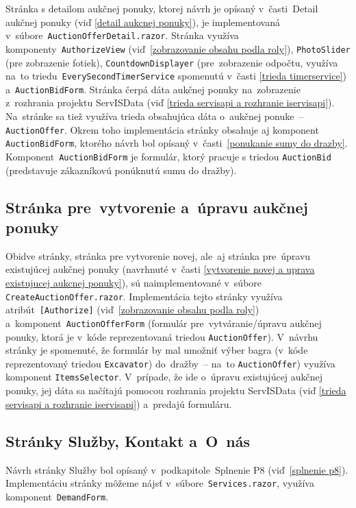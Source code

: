 Stránka s detailom aukčnej ponuky, ktorej návrh je opísaný v~časti~Detail aukčnej ponuky (viď \ref{detail aukcnej ponuky}), je implementovaná v~súbore~\verb|AuctionOfferDetail.razor|. Stránka využíva komponenty~\verb|AuthorizeView| (viď~\ref{zobrazovanie obsahu podla roly}), \verb|PhotoSlider| (pre zobrazenie fotiek), \verb|CountdownDisplayer| (pre~zobrazenie odpočtu, využíva na~to triedu~\verb|EverySecondTimerService| spomenutú v~časti \ref{trieda timerservice}) a~\verb|AuctionBidForm|. Stránka čerpá dáta aukčnej ponuky na~zobrazenie z~rozhrania projektu ServISData (viď \ref{trieda servisapi a rozhranie iservisapi}). Na~stránke sa tiež využíva trieda obsahujúca dáta o~aukčnej ponuke~-- \verb|AuctionOffer|. Okrem toho implementácia stránky obsahuje aj komponent \verb|AuctionBidForm|, ktorého návrh bol opísaný v~časti~\ref{ponukanie sumy do drazby}. Komponent~\verb|AuctionBidForm| je formulár, ktorý pracuje s triedou \verb|AuctionBid| (predstavuje zákazníkovú ponúknutú sumu do dražby).

\subsection{Stránka pre~vytvorenie a~úpravu aukčnej ponuky}

Obidve stránky, stránka pre vytvorenie novej, ale~aj stránka pre~úpravu existujúcej aukčnej ponuky (navrhnuté v~časti \ref{vytvorenie novej a uprava existujucej aukcnej ponuky}), sú naimplementované v~súbore \verb|CreateAuctionOffer.razor|. Implementácia tejto stránky využíva atribút~\verb|[Authorize]| (viď~\ref{zobrazovanie obsahu podla roly}) a~komponent~\verb|AuctionOfferForm| (formulár pre~vytváranie/úpravu aukčnej ponuky, ktorá je v~kóde reprezentovaná triedou \verb|AuctionOffer|). V~návrhu stránky je spomenuté, že formulár by mal umožniť výber bagra (v~kóde reprezentovaný triedou \verb|Excavator|) do~dražby~-- na~to \verb|AuctionOffer|) využíva komponent \verb|ItemsSelector|. V~prípade, že ide o~úpravu existujúcej aukčnej ponuky, jej dáta sa načítajú pomocou rozhrania projektu ServISData (viď \ref{trieda servisapi a rozhranie iservisapi}) a~predajú formuláru.

\subsection{Stránky Služby, Kontakt a~O~nás}

Návrh stránky Služby bol opísaný v~podkapitole~Splnenie P8 (viď~\ref{splnenie p8}). Implementáciu stránky môžeme nájsť v~súbore~\verb|Services.razor|, využíva komponent~\verb|DemandForm|.

